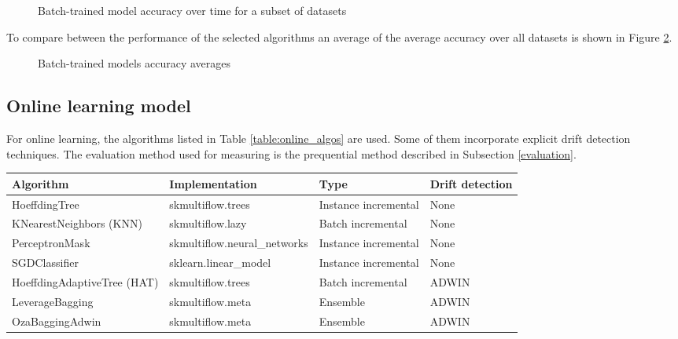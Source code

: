\documentclass{sig-alternate-br}
\begin{document}
\begin{figure}[h]
\centering 
{}
\caption{Batch-trained model accuracy over time for a subset of datasets}
\label{fig:batchdt}
\end{figure}

To compare between the performance of the selected algorithms an average of the average accuracy over all datasets is shown in Figure \ref{fig:batch_violins}.

\vspace{3cm}

\begin{figure}[h]
\centering 
{}
\caption{Batch-trained models accuracy averages}
\label{fig:batch_violins}
\end{figure}

\subsection{Online learning model}

For online learning, the algorithms listed in Table \ref{table:online_algos} are used. Some of them incorporate explicit drift detection techniques. The evaluation method used for measuring is the prequential method described in Subsection \ref{evaluation}.

\begin{table*}[h]
\centering
\renewcommand{\arraystretch}{1.25}
\begin{tabular}{|l|l|l|l|} \hline
\textbf{Algorithm} & \textbf{Implementation} & \textbf{Type}  & \textbf{Drift detection} \\ \hline
HoeffdingTree & skmultiflow.trees &  Instance incremental & None \\ \hline
KNearestNeighbors (KNN) & skmultiflow.lazy & Batch incremental & None \\ \hline
PerceptronMask & skmultiflow.neural\_networks & Instance incremental & None \\ \hline
SGDClassifier & sklearn.linear\_model & Instance incremental &  None \\ \hline
HoeffdingAdaptiveTree (HAT) & skmultiflow.trees & Batch incremental & ADWIN \\ \hline
LeverageBagging  & skmultiflow.meta & Ensemble &  ADWIN \\ \hline
OzaBaggingAdwin & skmultiflow.meta & Ensemble & ADWIN \\ \hline
\end{tabular}
\caption{Classifiers used for online learning}
\label{table:online_algos}
\end{table*}
\end{document}
